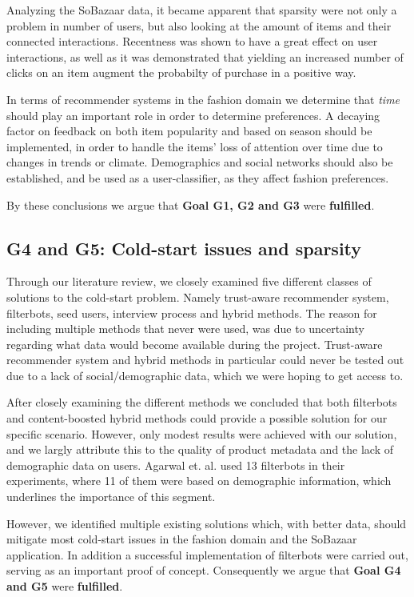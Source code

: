 Analyzing the SoBazaar data, it became apparent that sparsity were not only a
problem in number of users, but also looking at the amount of items and their
connected interactions. Recentness was shown to have a great effect on user
interactions, as well as it was demonstrated that yielding an increased number
of clicks on an item augment the probabilty of purchase in a positive way.

In terms of recommender systems in the fashion domain we determine that
\textit{time} should play an important role in order to determine preferences.
A decaying factor on feedback on both item popularity and based on season
should be implemented, in order to handle the items' loss of attention over
time due to changes in trends or climate. Demographics and social networks
should also be established, and be used as a user-classifier, as they affect
fashion preferences.

By these conclusions we argue that \textbf{Goal G1, G2 and G3} were
\textbf{fulfilled}.

\subsection{G4 and G5: Cold-start issues and sparsity}
\label{sec:cold-start-discussion}

Through our literature review, we closely examined five different classes of
solutions to the cold-start problem. Namely trust-aware recommender system,
filterbots, seed users, interview process and hybrid methods. The reason for
including multiple methods that never were used, was due to uncertainty
regarding what data would become available during the project. Trust-aware
recommender system and hybrid methods in particular could never be tested out
due to a lack of social/demographic data, which we were hoping to get access
to.

After closely examining the different methods we concluded that both filterbots
and content-boosted hybrid methods could provide a possible solution for our
specific scenario. However, only modest results were achieved with our
solution, and we largly attribute this to the quality of product metadata and
the lack of demographic data on users. Agarwal et. al. \cite{Agarwal2009} used
13 filterbots in their experiments, where 11 of them were based on demographic
information, which underlines the importance of this segment.

However, we identified multiple existing solutions which, with better data,
should mitigate most cold-start issues in the fashion domain and the SoBazaar
application. In addition a successful implementation of filterbots were carried
out, serving as an important proof of concept. Consequently we argue that
\textbf{Goal G4 and G5} were \textbf{fulfilled}.

